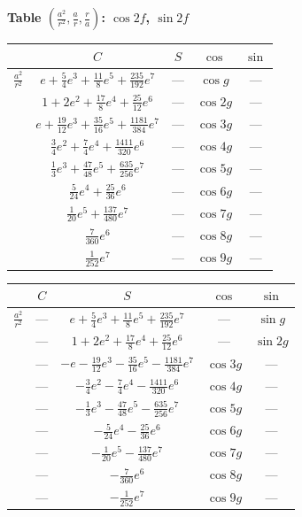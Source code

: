 \documentclass[11pt,a4paper]{book}
\begin{document}
\vspace{1em}

\noindent\textbf{Table $(\frac{a^2}{r^2}, \frac{a}{r}, \frac{r}{a})$: $\cos 2f$, $\sin 2f$}

\vspace{0.5em}

\begin{center}
\begin{tabular}{|c|c|c|c|c|}
\hline
& $C$ & $S$ & $\cos$ & $\sin$ \\
\hline
$\frac{a^2}{r^2}$ & $e + \frac{5}{4}e^3 + \frac{11}{8}e^5 + \frac{235}{192}e^7$ & --- & $\cos g$ & --- \\
& $1 + 2e^2 + \frac{17}{8}e^4 + \frac{25}{12}e^6$ & --- & $\cos 2g$ & --- \\
& $e + \frac{19}{12}e^3 + \frac{35}{16}e^5 + \frac{1181}{384}e^7$ & --- & $\cos 3g$ & --- \\
& $\frac{3}{4}e^2 + \frac{7}{4}e^4 + \frac{1411}{320}e^6$ & --- & $\cos 4g$ & --- \\
& $\frac{1}{3}e^3 + \frac{47}{48}e^5 + \frac{635}{256}e^7$ & --- & $\cos 5g$ & --- \\
& $\frac{5}{24}e^4 + \frac{25}{36}e^6$ & --- & $\cos 6g$ & --- \\
& $\frac{1}{20}e^5 + \frac{137}{480}e^7$ & --- & $\cos 7g$ & --- \\
& $\frac{7}{360}e^6$ & --- & $\cos 8g$ & --- \\
& $\frac{1}{252}e^7$ & --- & $\cos 9g$ & --- \\
\hline
\end{tabular}
\end{center}

\vspace{1em}

\begin{center}
\begin{tabular}{|c|c|c|c|c|}
\hline
& $C$ & $S$ & $\cos$ & $\sin$ \\
\hline
$\frac{a^2}{r^2}$ & --- & $e + \frac{5}{4}e^3 + \frac{11}{8}e^5 + \frac{235}{192}e^7$ & --- & $\sin g$ \\
& --- & $1 + 2e^2 + \frac{17}{8}e^4 + \frac{25}{12}e^6$ & --- & $\sin 2g$ \\
& --- & $-e - \frac{19}{12}e^3 - \frac{35}{16}e^5 - \frac{1181}{384}e^7$ & $\cos 3g$ & --- \\
& --- & $- \frac{3}{4}e^2 - \frac{7}{4}e^4 - \frac{1411}{320}e^6$ & $\cos 4g$ & --- \\
& --- & $- \frac{1}{3}e^3 - \frac{47}{48}e^5 - \frac{635}{256}e^7$ & $\cos 5g$ & --- \\
& --- & $- \frac{5}{24}e^4 - \frac{25}{36}e^6$ & $\cos 6g$ & --- \\
& --- & $- \frac{1}{20}e^5 - \frac{137}{480}e^7$ & $\cos 7g$ & --- \\
& --- & $- \frac{7}{360}e^6$ & $\cos 8g$ & --- \\
& --- & $- \frac{1}{252}e^7$ & $\cos 9g$ & --- \\
\hline
\end{tabular}
\end{center}
\end{document}
